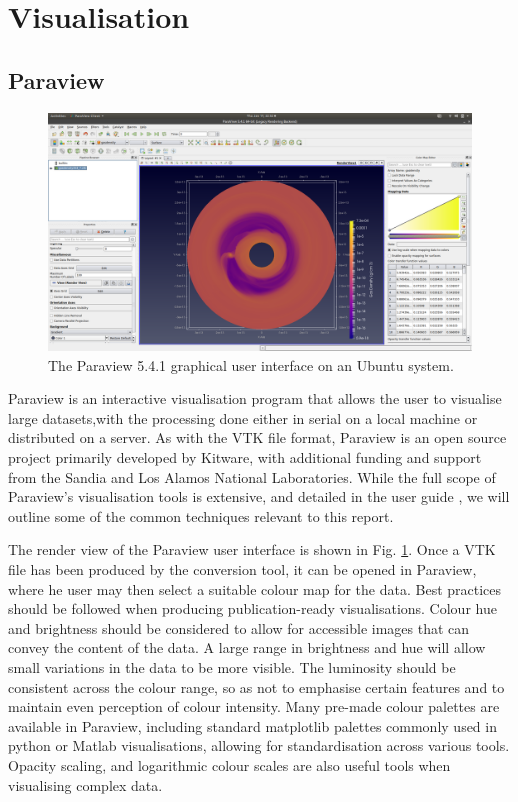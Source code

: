 \documentclass[preprint2]{aastex62}
\begin{document}
\section{Visualisation}
\subsection{Paraview}
\begin{figure}
	\includegraphics[width=\linewidth]{figures/Presentation/paraview.png}
	\caption{\label{fig:pviewinter}The Paraview 5.4.1 graphical user interface on an Ubuntu system.}
\end{figure}
Paraview is an interactive visualisation program that allows the user to visualise large datasets,with the processing done either in serial on a local machine or distributed on a server.
As with the VTK file format, Paraview is an open source project primarily developed by Kitware, with additional funding and support from the Sandia and Los Alamos National Laboratories.
While the full scope of Paraview's visualisation tools is extensive, and detailed in the user guide \cite{para}, we will outline some of the common techniques relevant to this report.

The render view of the Paraview user interface is shown in Fig. \ref{fig:pviewinter}.
Once a VTK file has been produced by the conversion tool, it can be opened in Paraview, where he user may then select a suitable colour map for the data. 
Best practices should be followed when producing publication-ready visualisations. Colour hue and brightness should be considered to allow for accessible images that can convey the content of the data. A large range in brightness and hue will allow small variations in the data to be more visible. 
The luminosity should be consistent across the colour range, so as not to emphasise certain features and to maintain even perception of colour intensity. 
Many pre-made colour palettes are available in Paraview, including standard matplotlib palettes commonly used in python or Matlab visualisations, allowing for standardisation across various tools.
Opacity scaling, and logarithmic colour scales are also useful tools when visualising complex data.
\end{document}
